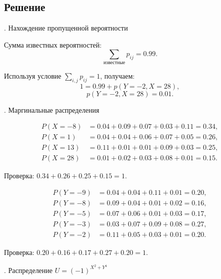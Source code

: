 \documentclass[a4paper,14pt]{extarticle}
\begin{document}
        \subsection*{Решение}
            
            . Нахождение пропущенной вероятности
            
            Сумма известных вероятностей:
            \[
                \sum_{\text{известные}} p_{ij} = 0.99.
            \]
            
            Используя условие $\sum_{i,j} p_{ij} = 1$, получаем:
            \[
                1 = 0.99 + p(Y=-2, X=28),
            \]
            \[
                \boxed{p(Y=-2, X=28) = 0.01.}
            \]
            
            . Маргинальные распределения
            
            \[
                \begin{aligned}
                    P(X=-8) &= 0.04 + 0.09 + 0.07 + 0.03 + 0.11 = 0.34, \\
                    P(X=1)  &= 0.04 + 0.04 + 0.06 + 0.07 + 0.05 = 0.26, \\
                    P(X=13) &= 0.11 + 0.01 + 0.01 + 0.09 + 0.03 = 0.25, \\
                    P(X=28) &= 0.01 + 0.02 + 0.03 + 0.08 + 0.01 = 0.15.
                \end{aligned}
            \]
            
            Проверка: $0.34 + 0.26 + 0.25 + 0.15 = 1.$
            
            \[
                \begin{aligned}
                    P(Y=-9) &= 0.04 + 0.04 + 0.11 + 0.01 = 0.20, \\
                    P(Y=-8) &= 0.09 + 0.04 + 0.01 + 0.02 = 0.16, \\
                    P(Y=-5) &= 0.07 + 0.06 + 0.01 + 0.03 = 0.17, \\
                    P(Y=-3) &= 0.03 + 0.07 + 0.09 + 0.08 = 0.27, \\
                    P(Y=-2) &= 0.11 + 0.05 + 0.03 + 0.01 = 0.20.
                \end{aligned}
            \]
            
            Проверка: $0.20 + 0.16 + 0.17 + 0.27 + 0.20 = 1.$
            
            . Распределение $U = (-1)^{X^2 + Y^4}$
            
\end{document}
